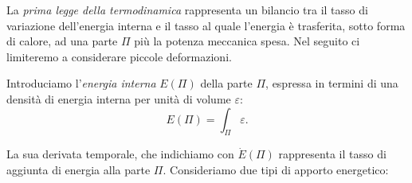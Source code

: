 La \textit{prima legge della termodinamica} rappresenta un bilancio tra il tasso di variazione dell'energia interna e il tasso al quale l'energia  è trasferita, sotto forma di calore, ad una parte  \( \Pi \) più la potenza meccanica spesa. Nel seguito ci limiteremo a considerare piccole deformazioni.

Introduciamo l'\textit{energia interna} $E(\Pi)$ della parte $\Pi$, espressa in termini di una densità di energia interna per unità di volume $\varepsilon$:
\begin{equation}
	E(\Pi) = \int_{\Pi} \varepsilon.
\end{equation}

La sua derivata temporale, che indichiamo con $\dot{E}(\Pi)$ rappresenta il tasso di aggiunta di energia alla parte $\Pi$.
Consideriamo due tipi di apporto energetico:

